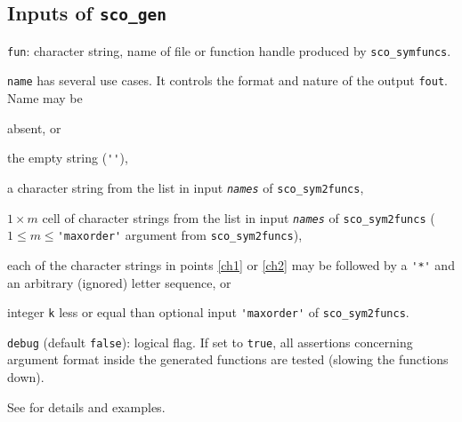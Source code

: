 \documentclass[11pt]{scrartcl}
\newcommand{\blist}[1]{\mbox{\lstinline!#1!}}
\newcommand{\genvar}[1]{\textit{\texttt{#1}}}
\begin{document}
\subsection{Inputs of \blist{sco_gen}}
\begin{compactitem}
\item \blist{fun}: character string, name of file or function handle
  produced by \blist{sco_symfuncs}.
\item \blist{name} has several use cases. It controls the format and nature of the output \blist{fout}. Name may be
  \begin{compactenum}[(i)]
  \item absent, or
  \item the empty string (\blist{''}),
  \item\label{ch1} a character string from the list in input \genvar{names} of
    \blist{sco_sym2funcs},
  \item\label{ch2} $1\times m$ cell of character strings from the list in input \genvar{names} of
    \blist{sco_sym2funcs} ($1\leq m\leq$\blist{'maxorder'} argument from \blist{sco_sym2funcs}),
  \item each of the character strings in points \ref{ch1} or \ref{ch2}
    may be followed by a \blist{'*'} and an arbitrary (ignored) letter
    sequence, or
  \item integer \blist{k} less or equal than optional input \blist{'maxorder'}
    of \blist{sco_sym2funcs}.
  \end{compactenum}
\item \blist{debug} (default \blist{false}): logical flag. If set to
  \blist{true}, all assertions concerning argument format inside the
  generated functions are tested (slowing the functions down).
\end{compactitem}
See  for details and examples.
\end{document}
